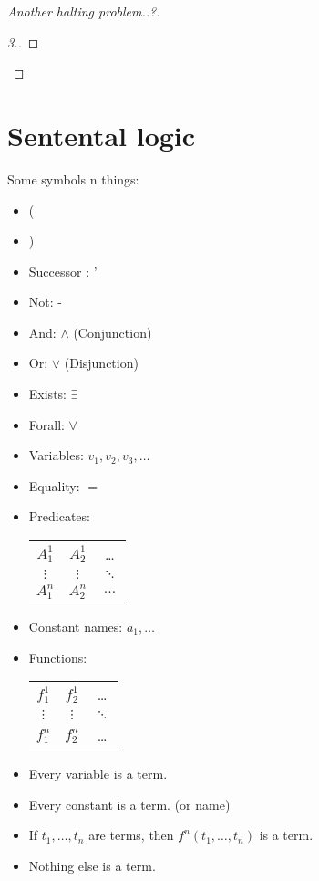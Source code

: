 \begin{proof}[Another halting problem..?]
\begin{proof}[3.]
\end{proof}
\end{proof}


\section{Sentental logic}
Some symbols n things:
\begin{itemize}
\item ( 
\item ) 
\item Successor : ' %
\item Not: -
\item And: $\wedge$ (Conjunction)
\item Or: $\vee$ (Disjunction)
\item Exists: $\exists$ 
\item Forall: $\forall$
\item Variables: $v_1, v_2, v_3, \dots$
\item Equality: $=$
\item Predicates: \begin{tabular}{c c c}
 $A^{1}_1$ & $A^{1}_2$  & \dots \\
 $\vdots $ & $\vdots$   & $\ddots$ \\
 $A^{n}_1$ & $A^{n}_2$  & $\dots$ \\
\end{tabular}
\item Constant names: $a_1, \dots$
\item Functions: \begin{tabular}{c c c}
 $f^{1}_1$ & $f^{1}_2$ & \dots \\
 $\vdots$    & $\vdots$ & $\ddots$ \\
 $f^{n}_1$ & $f^{n}_2$ & \dots \\
\end{tabular}
\end{itemize}


\begin{definition}[Term]
\begin{itemize}
\item Every variable is a term.
\item Every constant is a term. (or name)
\item If $t_1,\dots,t_n$ are terms, then $f^n(t_1,\dots,t_n)$ is a term.  
\item Nothing else is a term.
\end{itemize}
\end{definition}

